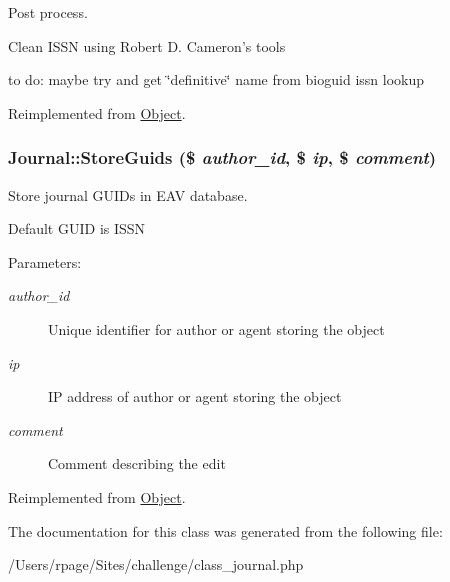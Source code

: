 Post process. 

Clean ISSN using Robert D. Cameron's tools

to do: maybe try and get \char`\"{}definitive\char`\"{} name from bioguid issn lookup 

Reimplemented from \hyperlink{class_object_4ca6ebed0ef8d6b792fec824e3fbe0bc}{Object}.\hypertarget{class_journal_b182da20eb5ceb7d1709e102a4666344}{
\subsubsection{\setlength{\rightskip}{0pt plus 5cm}Journal::StoreGuids (\$ {\em author\_\-id}, \/  \$ {\em ip}, \/  \$ {\em comment})}}
\label{class_journal_b182da20eb5ceb7d1709e102a4666344}


Store journal GUIDs in EAV database. 

Default GUID is ISSN

\begin{Desc}
\item[Parameters:]
\begin{description}
\item[{\em author\_\-id}]Unique identifier for author or agent storing the object \item[{\em ip}]IP address of author or agent storing the object \item[{\em comment}]Comment describing the edit \end{description}
\end{Desc}


Reimplemented from \hyperlink{class_object_dedb212835b4a878c89f7682ae11f772}{Object}.

The documentation for this class was generated from the following file:\begin{CompactItemize}
\item 
/Users/rpage/Sites/challenge/class\_\-journal.php\end{CompactItemize}
